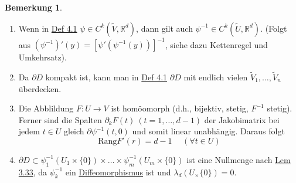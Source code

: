 \documentclass[a4paper]{report}
\newcommand{\R}{\mathbb{R}}
\newcommand{\jlabel}[1]{\label{j_#1}}
\newcommand{\jhyperref}[2]{\hyperref[j_#1]{#2}}
\newcommand{\jlink}[1]{\jhyperref{#1}{#1}}
\newcommand{\jabb}[3]{ #1: #2 \rightarrow #3 }
\theoremstyle{plain}
\theoremstyle{definition}
\newtheorem{bem}[thm]{Bemerkung}
\begin{document}
{{{{\jlabel{Bem 4.2}
\begin{bem}
    \begin{enumerate}
        \item Wenn in \jlink{Def 4.1} $\psi \in C^k(\tilde{V}, \R^d)$, dann gilt auch $\psi^{-1} \in C^k(\tilde{U}, \R^d)$. (Folgt aus $(\psi^{-1})'(y) = [\psi'(\psi^{-1}(y))]^{-1}$, siehe dazu Kettenregel und Umkehrsatz).
        \item Da $\partial D$ kompakt ist, kann man in \jlink{Def 4.1} $\partial D$ mit endlich vielen $\tilde{V}_1,\dots,\tilde{V}_n$ überdecken.
        \item Die Abblildung $\jabb{F}{U}{V}$ ist homöomorph (d.h., bijektiv, stetig, $F^{-1}$ stetig). Ferner sind die Spalten $\partial_kF(t) \ (t=1,\dots,d-1)$ der Jakobimatrix bei jedem $t\in U$ gleich $\partial \psi^{-1}(t,0)$ und somit linear unabhängig. Daraus folgt
        \begin{equation}
            \jlabel{(4.1)}
            \mathrm{Rang } F'(r) = d-1 \hspace{15pt} (\forall t\in U)
        \end{equation}
        \item $\partial D \subset \psi_1^{-1}(U_1 \times \{0\})\times \dots \times \psi_m^{-1}(U_m \times \{0\})$ ist eine Nullmenge nach \jlink{Lem 3.33}, da $\psi_k^{-1}$ ein \jlink{Diffeomorphismus} ist und $\lambda_d(U_ \times \{0\}) = 0$.
    \end{enumerate}
\end{bem}


}}}}
\end{document}
